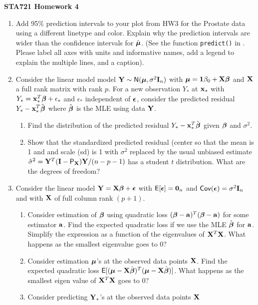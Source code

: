 \documentclass{article}
\begin{document}
{\bf STA721 \hfill Homework 4}

\vspace{.5in}
\begin{enumerate}
\item Add 95\% prediction intervals to your plot from HW3 for the
  Prostate data using a different linetype and color.  Explain why the
  prediction intervals are wider than the confidence intervals for
  $\hat{\boldsymbol{\mu}}$.  (See the function {\tt predict()} in \R.  Please
  label all axes with units and informative names, add a legend to
  explain the multiple lines, and a caption).   

\item Consider the linear model  model $\mathbf{Y} \sim \textsf{N}(\boldsymbol{\mu}, \sigma^2 \mathbf{I}_n)$
  with  $\boldsymbol{\mu} = \mathbf{1} \beta_0 + \mathbf{X} \boldsymbol{\beta}$ and $\mathbf{X}$ a full rank matrix with
  rank $p$.  For a new observation $Y_*$ at $\mathbf{x}_*$ with $Y_* =
  \mathbf{x}_*^T\boldsymbol{\beta} + \epsilon_*$ and $\epsilon_*$ independent of $\boldsymbol{\epsilon}$,  consider the
  predicted residual  $Y_* - \mathbf{x}^T_* \hat{\boldsymbol{\beta}}$ where $\hat{\boldsymbol{\beta}}$ is the MLE
  using data $\mathbf{Y}$.   
  \begin{enumerate}
  \item Find the distribution of the predicted residual $Y_* - \mathbf{x}^T_*
    \hat{\boldsymbol{\beta}}$ given $\boldsymbol{\beta}$ and  $\sigma^2$. 
\item Show that the standardized predicted residual (center so that
  the mean is 1 and and scale (sd) is 
  1 with $\sigma^2$ replaced by the usual unbiased estimate
  $\hat{\sigma}^2 = \mathbf{Y}^T(\mathbf{I}-\textsf{P}_{\mathbf{X}})\mathbf{Y}/ (n - p - 1)$ has a student $t$
  distribution.  What are the degrees of freedom?   
  \end{enumerate}
  \item   Consider the linear model $\mathbf{Y} = \mathbf{X}\boldsymbol{\beta} + \boldsymbol{\epsilon}$ with $\textsf{E}[\boldsymbol{\epsilon}]
    = \mathbf{0}_n$ and $\textsf{Cov}(\boldsymbol{\epsilon}) = \sigma^2 \mathbf{I}_n$ and with $\mathbf{X}$ of full
    column rank $(p+1)$.
  \begin{enumerate}
\item Consider estimation of $\boldsymbol{\beta}$ using quadratic loss $(\boldsymbol{\beta} -
  \mathbf{a})^T(\boldsymbol{\beta} - \mathbf{a})$ for some estimator $\mathbf{a}$.  Find the expected quadratic
  loss if we use the MLE $\hat{\boldsymbol{\beta}}$ for $\mathbf{a}$. Simplify the expression
  as a function of the eigenvalues of $\mathbf{X}^T\mathbf{X}$.   What happens as the
  smallest eigenvalue goes to 0?
\item Consider estimation $\boldsymbol{\mu}$'s at the observed data points
  $\mathbf{X}$.  Find the expected  quadratic loss   $\textsf{E}[(\boldsymbol{\mu} -
  \mathbf{X}\hat{\boldsymbol{\beta}})^T(\boldsymbol{\mu} - \mathbf{X}\hat{\boldsymbol{\beta}})]$.  What happens as the  smallest eigen
  value of $\mathbf{X}^T\mathbf{X}$ goes to 0?
\item Consider predicting $\mathbf{Y}_*$'s at the observed data points $\mathbf{X}$

\end{enumerate}
\end{enumerate}
\end{document}
